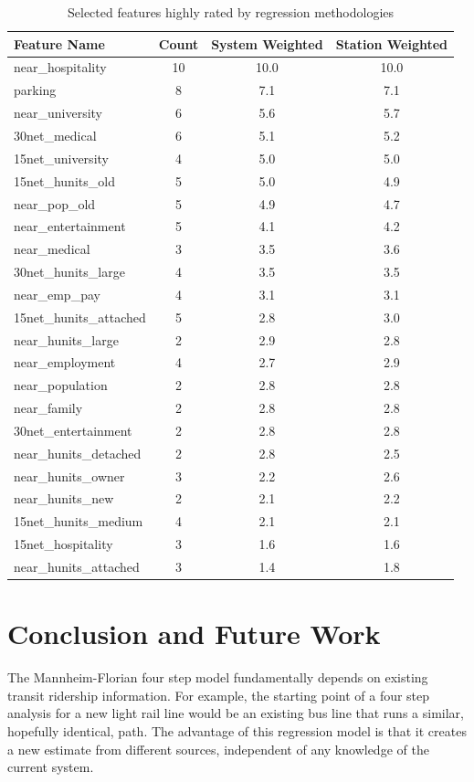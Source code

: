 \documentclass[11pt]{article}
\begin{document}
\begin{table}[H]
\begingroup\fontsize{10}{15}\selectfont
\centering
\begin{tabular}{lccc}
\toprule
Feature Name&Count&System Weighted&Station Weighted\\
\midrule
near\_hospitality&10&10.0&10.0\\
parking&8&7.1&7.1\\
near\_university&6&5.6&5.7\\
30net\_medical&6&5.1&5.2\\
15net\_university&4&5.0&5.0\\
15net\_hunits\_old&5&5.0&4.9\\
near\_pop\_old&5&4.9&4.7\\
near\_entertainment&5&4.1&4.2\\
near\_medical&3&3.5&3.6\\
30net\_hunits\_large&4&3.5&3.5\\
near\_emp\_pay&4&3.1&3.1\\
15net\_hunits\_attached&5&2.8&3.0\\
near\_hunits\_large&2&2.9&2.8\\
near\_employment&4&2.7&2.9\\
near\_population&2&2.8&2.8\\
near\_family&2&2.8&2.8\\
30net\_entertainment&2&2.8&2.8\\
near\_hunits\_detached&2&2.8&2.5\\
near\_hunits\_owner&3&2.2&2.6\\
near\_hunits\_new&2&2.1&2.2\\
15net\_hunits\_medium&4&2.1&2.1\\
15net\_hospitality&3&1.6&1.6\\
near\_hunits\_attached&3&1.4&1.8\\
\end{tabular}
\caption{Selected features highly rated by regression methodologies}\label{tab:featuresum}
\endgroup
\end{table}

\section{Conclusion and Future Work}

The Mannheim-Florian four step model fundamentally depends on existing transit ridership information. For example, the starting point of a four step analysis for a new light rail line would be an existing bus line that runs a similar, hopefully identical, path. The advantage of this regression model is that it creates a new estimate from different sources, independent of any knowledge of the current system.
\end{document}
